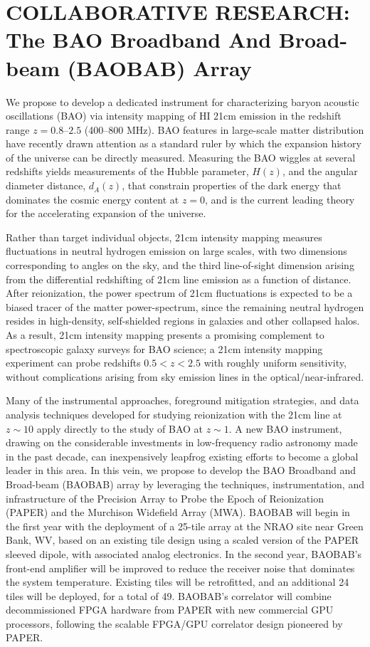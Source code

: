\documentclass[11pt]{article}
\begin{document}
\pagestyle{empty}

\section*{\small COLLABORATIVE RESEARCH: The BAO Broadband And Broad-beam (BAOBAB) Array}

We propose to develop a dedicated instrument for characterizing baryon acoustic
oscillations (BAO) via intensity mapping of HI 21cm emission in the redshift
range $z=0.8$--$2.5$ (400--800 MHz).  BAO features in large-scale matter
distribution have recently drawn attention as a standard ruler by which the
expansion history of the universe can be directly measured.  Measuring the BAO
wiggles at several redshifts yields measurements of 
the Hubble parameter, $H(z)$, and the angular diameter distance, $d_A(z)$, that
constrain properties of the dark energy that dominates the cosmic energy
content at $z=0$, and is the current leading theory for the accelerating
expansion of the universe.

Rather than target individual objects, 21cm intensity mapping 
measures fluctuations in neutral hydrogen emission on large scales, with two
dimensions corresponding to angles on the sky, and the third line-of-sight
dimension arising from the differential redshifting of 21cm line emission as a
function of distance. After reionization, the power spectrum of 21cm
fluctuations is expected to be a biased tracer of the matter power-spectrum,
since the remaining neutral hydrogen resides in high-density, self-shielded
regions in galaxies and other collapsed halos.  As a result, 21cm
intensity mapping presents a promising complement to spectroscopic
galaxy surveys for BAO science;
a 21cm intensity mapping experiment can probe redshifts $0.5<z<2.5$ with roughly
uniform sensitivity, without complications arising from sky emission lines in
the optical/near-infrared.

Many of the instrumental approaches,
foreground mitigation strategies, and data analysis techniques 
developed for studying reionization with the 21cm line at $z\!\sim\!10$ apply directly to the
study of BAO at $z\!\sim\!1$.  A new BAO instrument, drawing on the
considerable investments in low-frequency radio astronomy made in the past
decade, can inexpensively leapfrog existing efforts to become a global leader
in this area.  In this vein, we propose to develop the BAO Broadband and
Broad-beam (BAOBAB) array by leveraging the techniques, instrumentation, and
infrastructure of the Precision Array to Probe the Epoch of
Reionization (PAPER) and the Murchison Widefield Array (MWA).  BAOBAB will
begin in the first year with the deployment of a 25-tile array at the
NRAO site near Green Bank, WV, based on an
existing tile design using a scaled version of the PAPER sleeved dipole,
with associated analog electronics.  In the second year, BAOBAB's front-end amplifier
will be improved to reduce the receiver noise that
dominates the system temperature.  Existing tiles will be retrofitted, and an
additional 24 tiles will be deployed, for a total of 49.  BAOBAB's correlator will combine
decommissioned FPGA hardware from PAPER with new commercial GPU processors,
following the scalable FPGA/GPU correlator design pioneered by PAPER.
\end{document}
